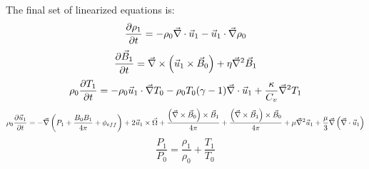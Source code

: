 \documentclass[apj,onecolumn]{emulateapj}
\newcommand{\uvec}{\ensuremath{\vec{u}}} %
\newcommand{\Bvec}{\ensuremath{\vec{B}}} %
\begin{document}
The final set of linearized equations is:
\begin{equation}
\dxdt{\rho_1} = -\rho_0\del\cdot\uvec_1 - \uvec_1\cdot\del\rho_0
\end{equation}
\begin{equation}
\dxdt{\Bvec_1} = \del\times\left(\uvec_1\times\Bvec_0\right)+\eta\del^2\Bvec_1
\end{equation}
\begin{equation}
\rho_0\dxdt{T_1} = -\rho_0\uvec_1\cdot\del T_0 -
                     \rho_0 T_0 (\gamma -1)\del\cdot\uvec_1 +
                     \frac{\kappa}{C_v}\del^2T_1
\end{equation}
\begin{equation}
\rho_0\dxdt{\uvec_1} = -\del\left(P_1 +\frac{B_0B_1}{4\pi} + \phi_{eff}\right)
                       +2\uvec_1\times\vec{\Omega} +
          \frac{\left(\del\times\Bvec_0\right)\times \Bvec_1}{4\pi} +
          \frac{\left(\del\times\Bvec_1\right)\times \Bvec_0}{4\pi} +
          \mu\del^2\uvec_1 + \frac{\mu}{3}\del\left(\del\cdot\uvec_1\right)
\end{equation}
\begin{equation}
\frac{P_1}{P_0} = \frac{\rho_1}{\rho_0} + \frac{T_1}{T_0}
\end{equation}




%
\end{document}
